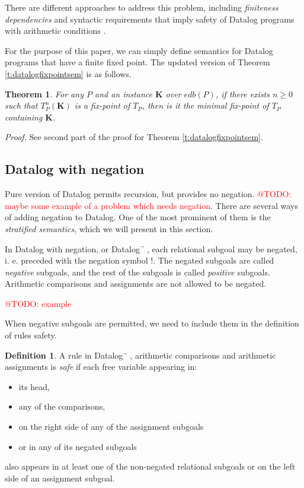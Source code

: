 \documentclass{pracamgr}
\makeatletter
\theoremstyle{plain}
\newtheorem{thm}{Theorem}[section]
\theoremstyle{definition}
\newtheorem{defn}{Definition}[section]
\theoremstyle{remark}
\newcommand{\todo}[1]{\textcolor{red}{@TODO: #1}}
\newcommand{\datalogneg}{Datalog$^{\neg}$ }
\makeatother
\begin{document}
There are different approaches to address this problem, including \emph{finiteness dependencies} and syntactic requirements that imply safety of Datalog programs with arithmetic conditions \cite{RBS87, KRS88a, KRS88b, SV89}.

For the purpose of this paper, we can simply define semantics for Datalog programs that have a finite fixed point. The updated version of Theorem \ref{t:datalogfixpointsem} is as follows.

\begin{thm}
For any $P$ and an instance $\textbf{K}$ over $edb(P)$, if there exists $n \ge 0$ such that $T_P^n(\textbf{K})$ is a fix-point of $T_P$, then is it the minimal fix-point of $T_P$ containing $\textbf{K}$.
\end{thm}
\emph{Proof.} See second part of the proof for Theorem \ref{t:datalogfixpointsem}.

\subsection{Datalog with negation}
Pure version of Datalog permits recursion, but provides no negation. \todo{maybe some example of a problem which needs negation}. There are several ways of adding negation to Datalog. One of the most prominent of them is the \emph{stratified semantics}, which we will present in this section. 

In Datalog with negation, or \datalogneg, each relational subgoal may be negated, i. e. preceded with the negation symbol $!$. The negated subgoals are called \emph{negative} subgoals, and the rest of the subgoals is called \emph{positive} subgoals. Arithmetic comparisons and assignments are not allowed to be negated.

\todo{example}

When negative subgoals are permitted, we need to include them in the definition of rules safety. 

\begin{defn}
A rule in \datalogneg, arithmetic comparisons and arithmetic assignments is \emph{safe} if each free variable appearing in:
\begin{itemize}
\item its head,
\item any of the comparisons,
\item on the right side of any of the assignment subgoals
\item or in any of its negated subgoals
\end{itemize}
also appears in at least one of the non-negated relational subgoals or on the left side of an assignment subgoal.
\end{defn}\label{d:datalogeqsaferule}
\end{document}
